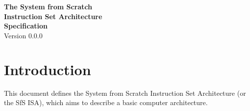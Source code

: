 


\vspace*{\fill}
\begin{flushright}
{\Huge\bf The System from Scratch\\Instruction Set Architecture\\Specification\\}
\vspace{2em}
{\Large Version 0.0.0}
\end{flushright}
\vspace*{\fill}
\pagebreak{}

\tableofcontents
\pagebreak{}

\section{Introduction}
This document defines the System from Scratch Instruction Set Architecture (or the SfS ISA), which aims to describe a basic computer architecture.


